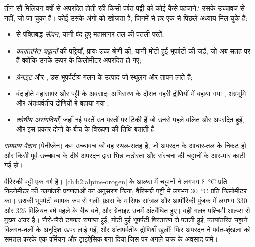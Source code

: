 तीन सौ मिलियन वर्षों से अपरदित होती रही किसी पर्वत-पट्टी को कोई कैसे पहचाने?
उसके उच्चावच से नहीं, जो जा चुका है। कोई उसके अंगों को खोजता है, जिनमें से हर एक से पिछले
अध्याय मिल चुके हैं:
\begin{itemize}
\item \emph{} से पंक्तिबद्ध \emph{सीवन}, यानी बंद हुए महासागर-तल की पतली परतें;
\item \emph{कायांतरित चट्टानों} की पट्टियाँ, प्रायः उच्च श्रेणी की, यानी मोटी हुई भूपर्पटी की जड़ें,
जो अब सतह पर हैं क्योंकि उनके ऊपर के किलोमीटर अपरदित हो गए;
\item \emph{ग्रेनाइट} और \emph{}, उस भूपर्पटीय गलन के उत्पाद जो
स्थूलन और तापन लाते हैं;
\item बंद होते महासागर और पट्टी के अवसाद: अभिसरण के दौरान गहरी द्रोणियों में बहाया गया \emph{},
अग्रभूमि और अंतःपर्वतीय द्रोणियों में बहाया गया \emph{};
\item \emph{कोणीय असंगतियाँ}, जहाँ नई परतें उन परतों पर टिकी हैं जो उनसे पहले वलित और
अपरदित हुईं, और इस प्रकार दोनों के बीच के विरूपण की तिथि बताती हैं।
\end{itemize}

\begin{definition}[समप्राय मैदान]\label{def:b2:wilson-cycle:peneplain}
\emph{समप्राय मैदान} (पेनीप्लेन) कम उच्चावच की वह स्थल-सतह है, जो अपरदन के आधार-तल
के निकट हो और किसी पूर्व उच्चावच के दीर्घ अपरदन द्वारा भिन्न कठोरता और संरचना की चट्टानों के आर-पार
काटी गई हो।
\end{definition}

वैरिस्की पट्टी एक गर्म  है। \cref{ch:b2:alpine-orogen} के आल्प्स में चट्टानों ने
लगभग \qty{8}{\celsius} प्रति किलोमीटर की कायांतरी प्रवणताओं का अनुसरण किया; वैरिस्की पट्टी में
लगभग \qty{30}{\celsius} प्रति किलोमीटर का। उसकी भूपर्पटी व्यापक रूप से गली: फ़्रांस के मासिफ़ सांत्राल
और आर्मोरिकी पुंजक में लगभग 330 और 325 मिलियन वर्ष पहले के बीच  बने, और
ग्रेनाइट उनमें अंतर्वेधित हुए। वही गलन पश्चिमी आल्प्स से मुख्य अंतर है। जैसे-जैसे
टक्कर समाप्त हुई, मोटी हुई भूपर्पटी विस्तारण से पतली हुई, कायांतरित चट्टानें
विलगन-तलों के अनुदिश ऊपर लाई गईं, और अंतःपर्वतीय द्रोणियाँ खुलीं; फिर अपरदन ने पर्वत-शृंखला को समतल करके एक
पर्मियन और ट्राइऐसिक  बना दिया जिस पर अगले चक्र के अवसाद जमे।


